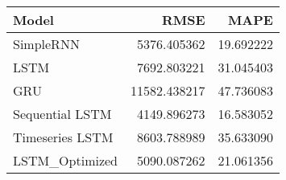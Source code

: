\begin{tabular}{lrr}
\toprule
Model & RMSE & MAPE \\
\midrule
SimpleRNN & 5376.405362 & 19.692222 \\
LSTM & 7692.803221 & 31.045403 \\
GRU & 11582.438217 & 47.736083 \\
Sequential LSTM & 4149.896273 & 16.583052 \\
Timeseries LSTM & 8603.788989 & 35.633090 \\
LSTM_Optimized & 5090.087262 & 21.061356 \\
\bottomrule
\end{tabular}
